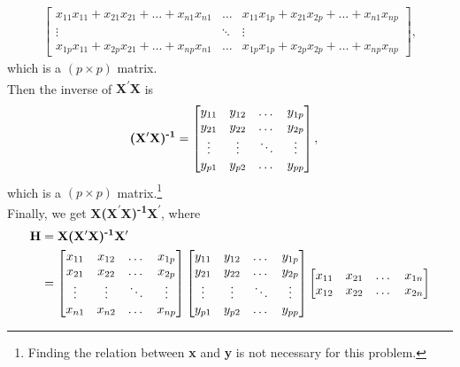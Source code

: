 \documentclass[10pt]{article}
\begin{document}
\begin{enumerate}[1)]
\begin{align*}
\begin{bmatrix}
    x_{11}x_{11}+x_{21}x_{21}+\dots+x_{n1}x_{n1} & \dots & x_{11}x_{1p}+x_{21}x_{2p}+\dots+x_{n1}x_{np}\\
    \vdots & \ddots & \vdots\\
    x_{1p}x_{11}+x_{2p}x_{21}+\dots+x_{np}x_{n1} & \dots & x_{1p}x_{1p}+x_{2p}x_{2p}+\dots+x_{np}x_{np}
  \end{bmatrix}
,
\end{align*}
which is a $(p\times p)$ matrix.\\
Then the inverse of \textbf{X\textsuperscript{$\prime$}X} is
\begin{align*}
\textbf{(X\textsuperscript{$\prime$}X)\textsuperscript{-1}}&=
  \begin{bmatrix}
    y_{11} & y_{12} & \dots & y_{1p}\\
    y_{21} & y_{22} & \dots & y_{2p}\\
    \vdots & \vdots & \ddots & \vdots\\
    y_{p1} & y_{p2} & \dots & y_{pp}
  \end{bmatrix}
,
\end{align*}
which is a $(p\times p)$ matrix.\footnote{\;Finding the relation between \textbf{x} and \textbf{y} is not necessary for this problem.}\\
Finally, we get \textbf{X(X\textsuperscript{$\prime$}X)\textsuperscript{-1}X\textsuperscript{$\prime$}}, where
\begin{align*}
\textbf{H}&=\textbf{X(X\textsuperscript{$\prime$}X)\textsuperscript{-1}X\textsuperscript{$\prime$}}\\
&=
  \begin{bmatrix}
    x_{11} & x_{12} & \dots & x_{1p}\\
    x_{21} & x_{22} & \dots & x_{2p}\\
    \vdots & \vdots & \ddots & \vdots\\
    x_{n1} & x_{n2} & \dots & x_{np}
  \end{bmatrix}
  \begin{bmatrix}
    y_{11} & y_{12} & \dots & y_{1p}\\
    y_{21} & y_{22} & \dots & y_{2p}\\
    \vdots & \vdots & \ddots & \vdots\\
    y_{p1} & y_{p2} & \dots & y_{pp}
  \end{bmatrix}
  \begin{bmatrix}
    x_{11} & x_{21} & \dots & x_{1n}\\
    x_{12} & x_{22} & \dots & x_{2n}\\

\end{bmatrix}
\end{align*}
\end{enumerate}
\end{document}
